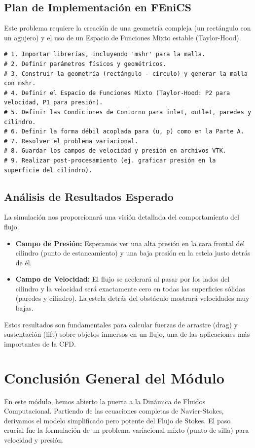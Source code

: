 \subsection{Plan de Implementación en FEniCS}
Este problema requiere la creación de una geometría compleja (un rectángulo con un agujero) y el uso de un Espacio de Funciones Mixto estable (Taylor-Hood).

\begin{tcolorbox}[colback=CodeBackground, title=Estructura del Script de Simulación de Stokes]
\begin{lstlisting}[style=pythonstyle]
# 1. Importar librerías, incluyendo 'mshr' para la malla.
# 2. Definir parámetros físicos y geométricos.
# 3. Construir la geometría (rectángulo - círculo) y generar la malla con mshr.
# 4. Definir el Espacio de Funciones Mixto (Taylor-Hood: P2 para velocidad, P1 para presión).
# 5. Definir las Condiciones de Contorno para inlet, outlet, paredes y cilindro.
# 6. Definir la forma débil acoplada para (u, p) como en la Parte A.
# 7. Resolver el problema variacional.
# 8. Guardar los campos de velocidad y presión en archivos VTK.
# 9. Realizar post-procesamiento (ej. graficar presión en la superficie del cilindro).
\end{lstlisting}
\end{tcolorbox}

\subsection{Análisis de Resultados Esperado}
La simulación nos proporcionará una visión detallada del comportamiento del flujo.
\begin{itemize}
    \item \textbf{Campo de Presión:} Esperamos ver una alta presión en la cara frontal del cilindro (punto de estancamiento) y una baja presión en la estela justo detrás de él.
    \item \textbf{Campo de Velocidad:} El flujo se acelerará al pasar por los lados del cilindro y la velocidad será exactamente cero en todas las superficies sólidas (paredes y cilindro). La estela detrás del obstáculo mostrará velocidades muy bajas.
\end{itemize}
Estos resultados son fundamentales para calcular fuerzas de arrastre (drag) y sustentación (lift) sobre objetos inmersos en un flujo, una de las aplicaciones más importantes de la CFD.

\section{Conclusión General del Módulo}
En este módulo, hemos abierto la puerta a la Dinámica de Fluidos Computacional. Partiendo de las ecuaciones completas de Navier-Stokes, derivamos el modelo simplificado pero potente del Flujo de Stokes. El paso crucial fue la formulación de un problema variacional mixto (punto de silla) para velocidad y presión.

